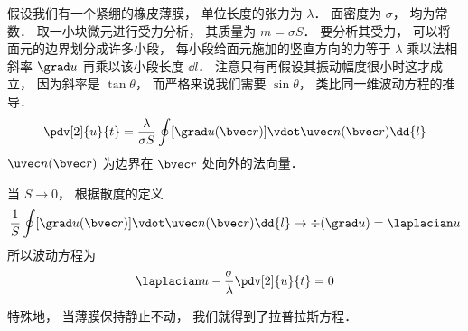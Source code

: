 
\begin{issues}
\issueDraft
\end{issues}


假设我们有一个紧绷的橡皮薄膜， 单位长度的张力为 $\lambda$． 面密度为 $\sigma$， 均为常数． 取一小块微元进行受力分析， 其质量为 $m = \sigma S$． 要分析其受力， 可以将面元的边界划分成许多小段， 每小段给面元施加的竖直方向的力等于 $\lambda$ 乘以法相斜率 $\grad u$ 再乘以该小段长度 $\dd{l}$． 注意只有再假设其振动幅度很小时这才成立， 因为斜率是 $\tan\theta$， 而严格来说我们需要 $\sin\theta$， 类比同一维波动方程的推导．
\begin{equation}
\pdv[2]{u}{t} = \frac{\lambda}{\sigma S}\oint [\grad u(\bvec r)] \vdot \uvec n(\bvec r) \dd{l}
\end{equation}
$\uvec n(\bvec r)$ 为边界在 $\bvec r$ 处向外的法向量．

当 $S \to 0$， 根据散度的定义
\begin{equation}
\frac{1}{S} \oint [\grad u(\bvec r)] \vdot \uvec n(\bvec r) \dd{l} \to \div (\grad u) = \laplacian u
\end{equation}
所以波动方程为
\begin{equation}
\laplacian u - \frac{\sigma}{\lambda}\pdv[2]{u}{t} = 0
\end{equation}

特殊地， 当薄膜保持静止不动， 我们就得到了拉普拉斯方程．
